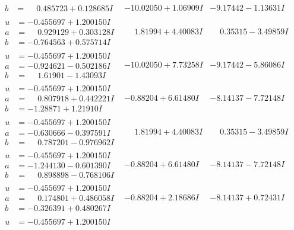 \documentclass[1p]{elsarticle_modified}
\theoremstyle{definition}
\begin{document}
$$\begin{array}{c|c|c}
\begin{aligned}
b &= \phantom{-}0.485723 + 0.128685 I\end{aligned}
 & -10.02050 + 1.06909 I & -9.17442 - 1.13631 I \\ \hline\begin{aligned}
u &= -0.455697 + 1.200150 I \\
a &= \phantom{-}0.929129 + 0.303128 I \\
b &= -0.764563 + 0.575714 I\end{aligned}
 & \phantom{-}1.81994 + 4.40083 I & \phantom{-}0.35315 - 3.49859 I \\ \hline\begin{aligned}
u &= -0.455697 + 1.200150 I \\
a &= -0.924621 - 0.502186 I \\
b &= \phantom{-}1.61901 - 1.43093 I\end{aligned}
 & -10.02050 + 7.73258 I & -9.17442 - 5.86086 I \\ \hline\begin{aligned}
u &= -0.455697 + 1.200150 I \\
a &= \phantom{-}0.807918 + 0.442221 I \\
b &= -1.28871 + 1.21910 I\end{aligned}
 & -0.88204 + 6.61480 I & -8.14137 - 7.72148 I \\ \hline\begin{aligned}
u &= -0.455697 + 1.200150 I \\
a &= -0.630666 - 0.397591 I \\
b &= \phantom{-}0.787201 - 0.976962 I\end{aligned}
 & \phantom{-}1.81994 + 4.40083 I & \phantom{-}0.35315 - 3.49859 I \\ \hline\begin{aligned}
u &= -0.455697 + 1.200150 I \\
a &= -1.244130 - 0.601390 I \\
b &= \phantom{-}0.898898 - 0.768106 I\end{aligned}
 & -0.88204 + 6.61480 I & -8.14137 - 7.72148 I \\ \hline\begin{aligned}
u &= -0.455697 + 1.200150 I \\
a &= \phantom{-}0.174801 + 0.486058 I \\
b &= -0.326391 + 0.480267 I\end{aligned}
 & -0.88204 + 2.18686 I & -8.14137 + 0.72431 I \\ \hline\begin{aligned}
u &= -0.455697 + 1.200150 I \\

\end{aligned}
\end{array}$$
\end{document}
